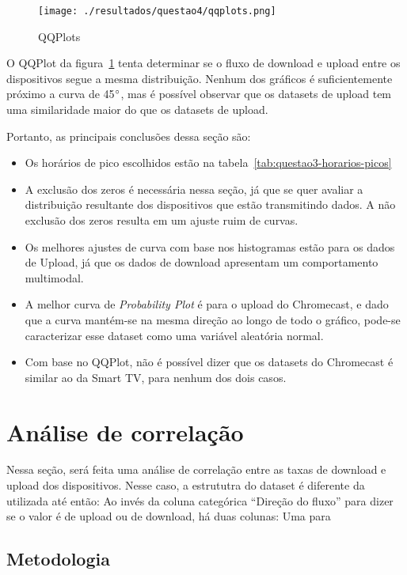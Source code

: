 \documentclass{article}
\begin{document}
\begin{figure}[h]
	\centering
	\caption{QQPlots}
	\texttt{[image: ./resultados/questao4/qqplots.png]}
	\label{fig:qqplot}
\end{figure}

O QQPlot da figura~\ref{fig:qqplot} tenta determinar se o fluxo de download e upload entre os dispositivos segue a mesma distribuição. Nenhum dos gráficos é suficientemente próximo a curva de 45$\degree$, mas é possível observar que os datasets de upload tem uma similaridade maior do que os datasets de upload.

Portanto, as principais conclusões dessa seção são:
\begin{itemize}
	\item Os horários de pico escolhidos estão na tabela~\ref{tab:questao3-horarios-picos}
	\item A exclusão dos zeros é necessária nessa seção, já que se quer avaliar a distribuição resultante dos dispositivos que estão transmitindo dados. A não exclusão dos zeros resulta em um ajuste ruim de curvas.
	\item Os melhores ajustes de curva com base nos histogramas estão para os dados de Upload, já que os dados de download apresentam um comportamento multimodal.
	\item A melhor curva de \textit{Probability Plot} é para o upload do Chromecast, e dado que a curva mantém-se na mesma direção ao longo de todo o gráfico, pode-se caracterizar esse dataset como uma variável aleatória normal.
	\item Com base no QQPlot, não é possível dizer que os datasets do Chromecast é similar ao da Smart TV, para nenhum dos dois casos.
\end{itemize}


\section{Análise de correlação}

Nessa seção, será feita uma análise de correlação entre as taxas de download e upload dos dispositivos. Nesse caso, a estrututra do dataset é diferente da utilizada até então: Ao invés da coluna categórica ``Direção do fluxo'' para dizer se o valor é de upload ou de download, há duas colunas: Uma para

\subsection{Metodologia}
\end{document}
